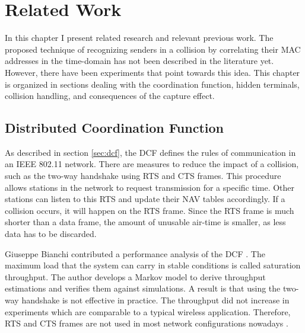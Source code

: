 
\chapter{Related Work}\label{ch:relatedwork}
\glsresetall %

In this chapter I present related research and relevant previous work. The proposed technique of recognizing senders in a collision by correlating their \gls{MAC} addresses in the time-domain has not been described in the literature yet. However, there have been experiments that point towards this idea. This chapter is organized in sections dealing with the coordination function, hidden terminals, collision handling, and consequences of the capture effect.



\section{Distributed Coordination Function}\label{sec:related-dcf}

As described in section \ref{sec:dcf}, the \gls{DCF} defines the rules of communication in an IEEE 802.11 network. There are measures to reduce the impact of a collision, such as the two-way handshake using \gls{RTS} and \gls{CTS} frames. This procedure allows stations in the network to request transmission for a specific time. Other stations can listen to this \gls{RTS} and update their \gls{NAV} tables accordingly. If a collision occurs, it will happen on the \gls{RTS} frame. Since the \gls{RTS} frame is much shorter than a data frame, the amount of unusable air-time is smaller, as less data has to be discarded.

Giuseppe Bianchi contributed a performance analysis of the \gls{DCF} \cite{bianchi2000}. The maximum load that the system can carry in stable conditions is called saturation throughput. The author develops a Markov model to derive throughput estimations and verifies them against simulations. A result is that using the two-way handshake is not effective in practice. The throughput did not increase in experiments which are comparable to a  typical wireless application. Therefore, \gls{RTS} and \gls{CTS} frames are not used in most network configurations nowadays \cite{bianchi2000, gollakota2008, choi2013}.\\

